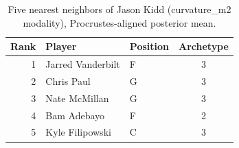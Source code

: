 \begin{table}[htbp]
  \centering\small
  \begin{tabular}{rllc}
    \toprule
    Rank & Player & Position & Archetype \\
    \midrule
    1 & Jarred Vanderbilt & F & 3 \\
    2 & Chris Paul & G & 3 \\
    3 & Nate McMillan & G & 3 \\
    4 & Bam Adebayo & F & 2 \\
    5 & Kyle Filipowski & C & 3 \\
    \bottomrule
  \end{tabular}
  \caption{Five nearest neighbors of Jason Kidd (curvature_m2 modality), Procrustes-aligned posterior mean.}
  \label{tab:Jason_Kidd_neighbors_curvature_m2}
\end{table}

